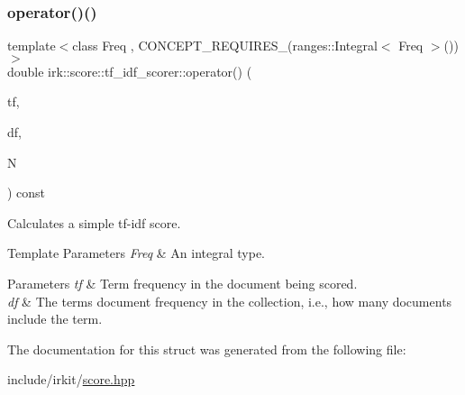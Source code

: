 \subsubsection{\texorpdfstring{operator()()}{operator()()}}
{\footnotesize\ttfamily template$<$class Freq , C\+O\+N\+C\+E\+P\+T\+\_\+\+R\+E\+Q\+U\+I\+R\+E\+S\+\_\+(ranges\+::\+Integral$<$ Freq $>$()) $>$ \\
double irk\+::score\+::tf\+\_\+idf\+\_\+scorer\+::operator() (\begin{DoxyParamCaption}\item[{Freq}]{tf,  }\item[{Freq}]{df,  }\item[{std\+::size\+\_\+t}]{N }\end{DoxyParamCaption}) const\hspace{0.3cm}{\ttfamily [inline]}}



Calculates a simple tf-\/idf score. 


\begin{DoxyTemplParams}{Template Parameters}
{\em Freq} & An integral type. \\
\hline
\end{DoxyTemplParams}

\begin{DoxyParams}{Parameters}
{\em tf} & Term frequency in the document being scored. \\
\hline
{\em df} & The term\textquotesingle{}s document frequency in the collection, i.\+e., how many documents include the term. \\
\hline
\end{DoxyParams}


The documentation for this struct was generated from the following file\+:\begin{DoxyCompactItemize}
\item 
include/irkit/\mbox{\hyperlink{score_8hpp}{score.\+hpp}}\end{DoxyCompactItemize}
